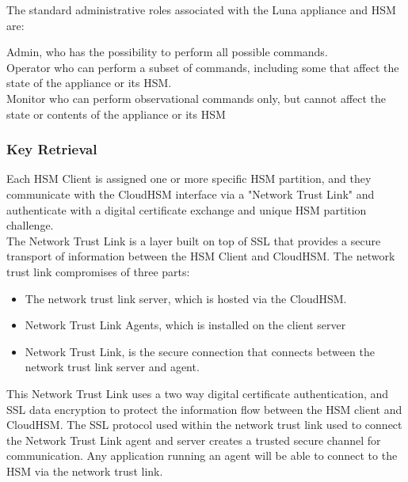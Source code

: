 			The standard administrative roles associated with the Luna appliance and HSM are:

			Admin, who has the possibility to perform all possible commands. \\

			Operator who can perform a subset of commands, including some that affect the state of the appliance or its HSM. \\

			Monitor who can perform observational commands only, but cannot affect the state or contents of the appliance or its HSM \\

			\subsubsection{Key Retrieval}

			Each HSM Client is assigned one or more specific HSM partition, and they communicate with the CloudHSM interface via a {"Network Trust Link"} and authenticate with a digital certificate exchange and unique HSM partition challenge.  \\

			The Network Trust Link is a layer built on top of SSL that provides a secure transport of information between the HSM Client and CloudHSM. The network trust link compromises of three parts:

			\begin{itemize}

				\item The network trust link server, which is hosted via the CloudHSM.	
			
				\item Network Trust Link Agents, which is installed on the client server
			
				\item Network Trust Link, is the secure connection that connects between the network trust link server and agent.

			\end{itemize}

			This Network Trust Link uses a two way digital certificate authentication, and SSL data encryption to protect the information flow between the HSM client and CloudHSM. The SSL protocol used within the network trust link used to connect the Network Trust Link agent and server creates a trusted secure channel for communication. Any application running an agent will be able to connect to the HSM via the network trust link. \\\

